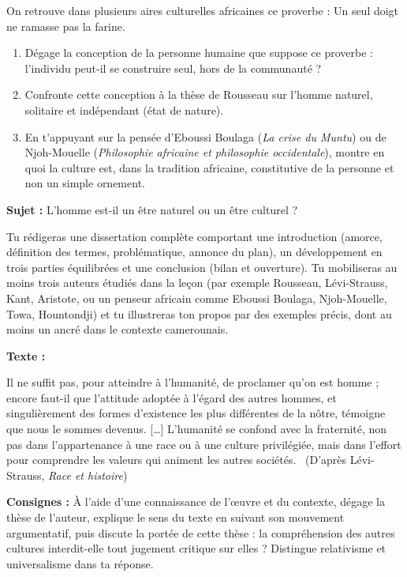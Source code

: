\documentclass[11pt]{article}
\newcommand{\cle}[1]{{\popxbold\color{popdark}#1}}
\newcounter{popsec}
\newcounter{popsub}
\newcommand{\courssub}[1]{%
  \stepcounter{popsub}%
  \par\vspace{9pt}\noindent{\popxbold\fontsize{11.5}{13}\selectfont\color{popink}{\color{poporange}\thepopsec.\thepopsub}\hspace{6pt}#1}\par\nopagebreak\vspace{4pt}
}
\begin{document}
\begin{exercice}
On retrouve dans plusieurs aires culturelles africaines ce proverbe : \guillemotleft Un seul doigt ne ramasse pas la farine. \guillemotright

\begin{enumerate}
\item Dégage la conception de la personne humaine que suppose ce proverbe : l'individu peut-il se construire seul, hors de la communauté ?
\item Confronte cette conception à la thèse de Rousseau sur l'homme naturel, solitaire et indépendant (état de nature).
\item En t'appuyant sur la pensée d'Eboussi Boulaga (\emph{La crise du Muntu}) ou de Njoh-Mouelle (\emph{Philosophie africaine et philosophie occidentale}), montre en quoi la culture est, dans la tradition africaine, constitutive de la personne et non un simple ornement.
\end{enumerate}
\end{exercice}

\courssub{Je me prépare au Bac}

\begin{exercice}
\textbf{Sujet :} L'homme est-il un être naturel ou un être culturel ?

Tu rédigeras une dissertation complète comportant une introduction (amorce, définition des termes, problématique, annonce du plan), un développement en trois parties équilibrées et une conclusion (bilan et ouverture). Tu mobiliseras au moins trois auteurs étudiés dans la leçon (par exemple Rousseau, Lévi-Strauss, Kant, Aristote, ou un penseur africain comme Eboussi Boulaga, Njoh-Mouelle, Towa, Hountondji) et tu illustreras ton propos par des exemples précis, dont au moins un ancré dans le contexte camerounais.
\end{exercice}

\begin{exercice}
\textbf{Texte :}

\guillemotleft Il ne suffit pas, pour atteindre à l'humanité, de proclamer qu'on est homme ; encore faut-il que l'attitude adoptée à l'égard des autres hommes, et singulièrement des formes d'existence les plus différentes de la nôtre, témoigne que nous le sommes devenus. [\ldots] L'humanité se confond avec la fraternité, non pas dans l'appartenance à une race ou à une culture privilégiée, mais dans l'effort pour comprendre les valeurs qui animent les autres sociétés. \guillemotright\ (D'après Lévi-Strauss, \emph{Race et histoire})

\textbf{Consignes :} À l'aide d'une connaissance de l'œuvre et du contexte, dégage la thèse de l'auteur, explique le sens du texte en suivant son mouvement argumentatif, puis discute la portée de cette thèse : la compréhension des autres cultures interdit-elle tout jugement critique sur elles ? Distingue \cle{relativisme} et \cle{universalisme} dans ta réponse.
\end{exercice}
\end{document}
